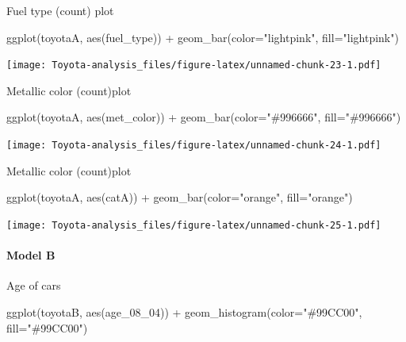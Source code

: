 \documentclass[
]{article}
\newenvironment{Shaded}{\begin{snugshade}}{\end{snugshade}}
\newcommand{\AttributeTok}[1]{\textcolor[rgb]{0.77,0.63,0.00}{#1}}
\newcommand{\FunctionTok}[1]{\textcolor[rgb]{0.00,0.00,0.00}{#1}}
\newcommand{\NormalTok}[1]{#1}
\newcommand{\SpecialCharTok}[1]{\textcolor[rgb]{0.00,0.00,0.00}{#1}}
\newcommand{\StringTok}[1]{\textcolor[rgb]{0.31,0.60,0.02}{#1}}
\begin{document}
Fuel type (count) plot

\begin{Shaded}
\begin{Highlighting}[]
\FunctionTok{ggplot}\NormalTok{(toyotaA, }\FunctionTok{aes}\NormalTok{(fuel\_type)) }\SpecialCharTok{+} \FunctionTok{geom\_bar}\NormalTok{(}\AttributeTok{color=}\StringTok{"lightpink"}\NormalTok{, }\AttributeTok{fill=}\StringTok{"lightpink"}\NormalTok{) }
\end{Highlighting}
\end{Shaded}

\texttt{[image: Toyota-analysis\_files/figure-latex/unnamed-chunk-23-1.pdf]}

Metallic color (count)plot

\begin{Shaded}
\begin{Highlighting}[]
\FunctionTok{ggplot}\NormalTok{(toyotaA, }\FunctionTok{aes}\NormalTok{(met\_color)) }\SpecialCharTok{+} \FunctionTok{geom\_bar}\NormalTok{(}\AttributeTok{color=}\StringTok{"\#996666"}\NormalTok{, }\AttributeTok{fill=}\StringTok{"\#996666"}\NormalTok{)}
\end{Highlighting}
\end{Shaded}

\texttt{[image: Toyota-analysis\_files/figure-latex/unnamed-chunk-24-1.pdf]}

Metallic color (count)plot

\begin{Shaded}
\begin{Highlighting}[]
\FunctionTok{ggplot}\NormalTok{(toyotaA, }\FunctionTok{aes}\NormalTok{(catA)) }\SpecialCharTok{+} \FunctionTok{geom\_bar}\NormalTok{(}\AttributeTok{color=}\StringTok{"orange"}\NormalTok{, }\AttributeTok{fill=}\StringTok{"orange"}\NormalTok{)}
\end{Highlighting}
\end{Shaded}

\texttt{[image: Toyota-analysis\_files/figure-latex/unnamed-chunk-25-1.pdf]}

\hypertarget{model-b-6}{%
\paragraph{Model B}\label{model-b-6}}

Age of cars

\begin{Shaded}
\begin{Highlighting}[]
\FunctionTok{ggplot}\NormalTok{(toyotaB, }\FunctionTok{aes}\NormalTok{(age\_08\_04)) }\SpecialCharTok{+} \FunctionTok{geom\_histogram}\NormalTok{(}\AttributeTok{color=}\StringTok{"\#99CC00"}\NormalTok{, }\AttributeTok{fill=}\StringTok{"\#99CC00"}\NormalTok{)}
\end{Highlighting}
\end{Shaded}
\end{document}
